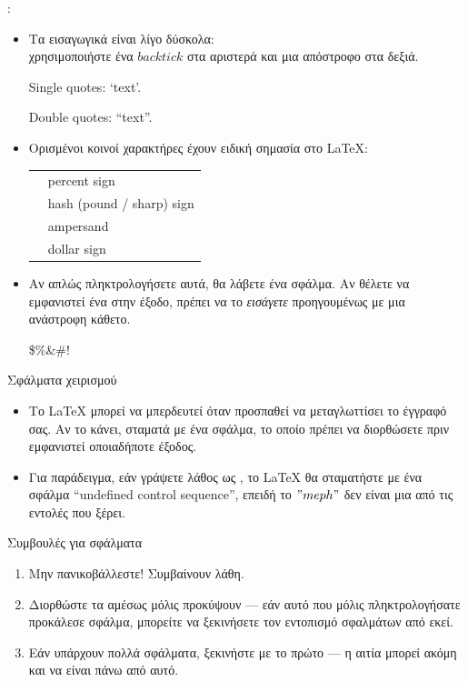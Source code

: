 \documentclass{beamer}
\begin{document}
\begin{frame}[fragile]{\insertsubsection{}: }
\small
\begin{itemize}
\item Τα εισαγωγικά είναι λίγο δύσκολα:\\
χρησιμοποιήστε ένα $backtick$ \keystroke{\`{}} στα αριστερά και μια απόστροφο \keystroke{\'{}} στα δεξιά.
\en
\begin{exampletwouptiny}
Single quotes: `text'.

Double quotes: ``text''.
\end{exampletwouptiny}
\gr
\item Ορισμένοι κοινοί χαρακτήρες έχουν ειδική σημασία στο \LaTeX:\\[1ex]
\en
\begin{tabular}{cl}
\keystrokebftt{\%} & percent sign              \\
\keystrokebftt{\#} & hash (pound / sharp) sign \\
\keystrokebftt{\&} & ampersand                 \\
\keystrokebftt{\$} & dollar sign               \\
\end{tabular}
\gr
\item Αν απλώς πληκτρολογήσετε αυτά, θα λάβετε ένα σφάλμα. Αν θέλετε να εμφανιστεί ένα
στην έξοδο, πρέπει να το \emph{εισάγετε} προηγουμένως με μια ανάστροφη κάθετο.
\en
\begin{exampletwoup}
\$\%\&\#!
\end{exampletwoup}
\end{itemize}
\end{frame}
\gr
\begin{frame}[fragile]{Σφάλματα χειρισμού}
\begin{itemize}
\item Το \LaTeX{} μπορεί να μπερδευτεί όταν προσπαθεί να μεταγλωττίσει το έγγραφό σας. Αν
το κάνει, σταματά με ένα σφάλμα, το οποίο πρέπει να διορθώσετε πριν εμφανιστεί
οποιαδήποτε έξοδος.
\item Για παράδειγμα, εάν γράψετε λάθος \en {} \gr ως \en {} \gr, το \LaTeX{} θα
σταματήστε με ένα σφάλμα \en ``undefined control sequence''\gr, επειδή το $"meph"$ δεν είναι
μια από τις εντολές που ξέρει.
\end{itemize}
\begin{block}{Συμβουλές για σφάλματα}
\begin{enumerate}
\item Μην πανικοβάλλεστε! Συμβαίνουν λάθη.
\item Διορθώστε τα αμέσως μόλις προκύψουν --- εάν αυτό που μόλις πληκτρολογήσατε προκάλεσε σφάλμα,
μπορείτε να ξεκινήσετε τον εντοπισμό σφαλμάτων από εκεί.
\item Εάν υπάρχουν πολλά σφάλματα, ξεκινήστε με το πρώτο --- η αιτία μπορεί
ακόμη και να είναι πάνω από αυτό.
\end{enumerate}
\end{block}
\end{frame}
\end{document}
